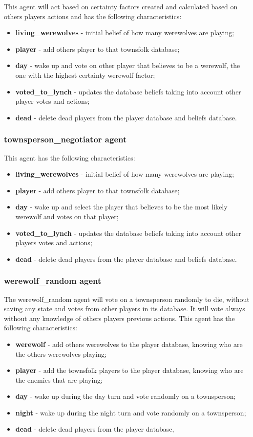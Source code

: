 \documentclass{article}
\begin{document}
This agent will act based on certainty factors created and calculated based on others players actions and has the following characteristics:
\begin{itemize}
	\item \textbf{living\_werewolves} - initial belief of how many werewolves are playing; 
	\item \textbf{player} - add others player to that townsfolk database;
	\item \textbf{day} - wake up and vote on other player that believes to be a werewolf, the one with the highest certainty werewolf factor;
	\item \textbf{voted\_to\_lynch} - updates the database beliefs taking into account other player votes and actions;
	\item \textbf{dead} - delete dead players from the player database and beliefs database.
\end{itemize}

\subsubsection{townsperson\_negotiator agent}
This agent has the following characteristics:
\begin{itemize}
	\item \textbf{living\_werewolves} - initial belief of how many werewolves are playing; 
	\item \textbf{player} - add others player to that townsfolk database;
	\item \textbf{day} - wake up and select the player that believes to be the most likely werewolf and votes on that player;
	\item \textbf{voted\_to\_lynch} - updates the database beliefs taking into account other players votes and actions;
	\item \textbf{dead} - delete dead players from the player database and beliefs database.
\end{itemize}
\subsubsection{werewolf\_random agent}
The werewolf\_random agent will vote on a townsperson randomly to die, without saving any state and votes from other players in its database. It will vote always without any knowledge of others players previous actions.
This agent has the following characteristics:
\begin{itemize}
	\item \textbf{werewolf} - add others werewolves to the player database, knowing who are the others werewolves playing;
	\item \textbf{player} - add the townsfolk players to the player database, knowing who are the enemies that are playing;
	\item \textbf{day} - wake up during the day turn and vote randomly on a townsperson;
	\item \textbf{night} - wake up during the night turn and vote randomly on a townsperson;
	\item \textbf{dead} - delete dead players from the player database,
\end{itemize}
\end{document}
